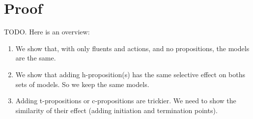 \section{Proof}\label{sec:proof}

TODO. Here is an overview:

\begin{enumerate}
  \item We show that, with only fluents and actions, and no propositions, the models are the same.
  \item We show that adding h-proposition(s) has the same selective effect on boths sets of models. So we keep the same models.
  \item Adding t-propositions or c-propositions are trickier. We need to show the similarity of their effect (adding initiation and termination points).
\end{enumerate}
